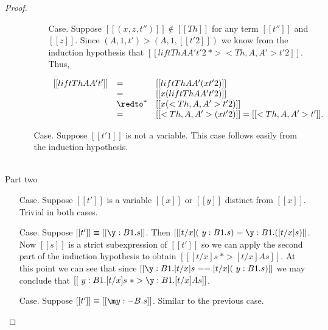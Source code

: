 \begin{proof}
\begin{itemize}
\begin{itemize}
\begin{itemize}
      \item[Case.] Suppose $[[(x,z,t'')]] \not \in [[Th]]$ for any term $[[t'']]$ and $[[z]]$.  
        Since $(A,1,t') > (A,1,[[t'2]])$ we know from the 
        induction hypothesis that $[[lift Th A A' t'2 ~*> <Th,A,A'>t'2]]$.  Thus,
        \begin{center}
          \begin{math}
            \begin{array}{lll}
              [[lift Th A A' t']] & = & [[lift Th A A' (x t'2)]]\\ 
              & = & [[x (lift Th A A' t'2)]]\\ 
              & \redto^* & [[x (<Th,A,A'>t'2)]]\\
              & = & [[<Th,A,A'> (x t'2)]] = [[<Th,A,A'>t']].
            \end{array}
          \end{math}
        \end{center}
      \end{itemize}
    \item[Case.] Suppose $[[t'1]]$ is not a variable.  This case follows easily from
      the induction hypothesis.
    \end{itemize}
  \end{itemize}

  \ \\
  \noindent Part two\\
  \begin{itemize}
  \item[Case.] Suppose $[[t']]$ is a variable $[[x]]$ or $[[y]]$ distinct from $[[x]]$.  
    Trivial in both cases.
    
  \item[Case.] Suppose $[[t']] \equiv [[\y:B1.s]]$.  Then
    $[[ [t/x] (\ y:B1.s) = \y:B1.([t/x] s)]]$. 
    Now $[[s]]$ is a strict subexpression of $[[t']]$ so we can apply the second part of the induction hypothesis to obtain 
    $[[ [t/x]s ~*> [t/x] A s]]$.  At this point we can see that since 
    $[[\y:B1.[t/x]s == [t/x](\ y:B1.s)]]$ we may
    conclude that $[[\ y:B1.[t/x]s ~*> \y:B1.[t/x] A s]]$.

  \item[Case.] Suppose $[[t']] \equiv [[\m y:{-B}.s]]$.  Similar to the previous case.


\end{itemize}
\end{proof}
